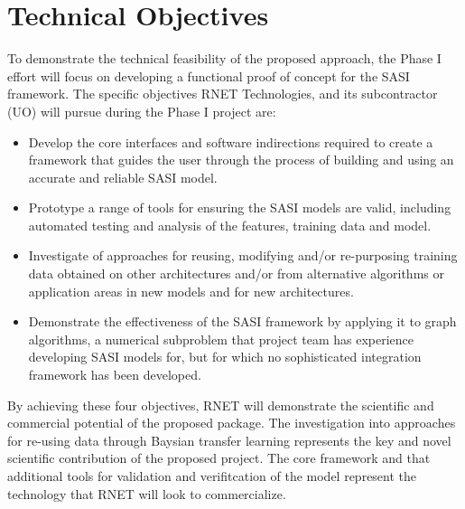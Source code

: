 \section{Technical Objectives}
 
To demonstrate the technical feasibility of the proposed approach, the Phase I effort will focus on developing a functional proof of concept for the SASI framework. The specific objectives RNET Technologies, and its subcontractor (UO) will pursue during the Phase I project are:
\begin{itemize}
  \item Develop the core interfaces and software indirections required to create a framework that 
  guides the user through the process of building and using an accurate and reliable SASI model.
  \item Prototype a range of tools for ensuring the SASI models are valid, including automated testing and analysis of the features, training data and model. 
  \item Investigate of approaches for reusing, modifying and/or re-purposing training data obtained on other architectures and/or from alternative algorithms or application areas in new models and for new architectures. 
  \item Demonstrate the effectiveness of the SASI framework by applying it to graph algorithms, a numerical subproblem that
  project team has experience developing SASI models for, but for which no sophisticated integration framework has been developed. 
\end{itemize}

By achieving these four objectives, RNET will demonstrate the scientific and commercial potential of the proposed package. The investigation into approaches for re-using data through Baysian transfer learning represents the key and novel scientific contribution of the proposed project. The core framework and that additional tools for validation and verifitcation of the model represent the technology that RNET will look to commercialize. 
